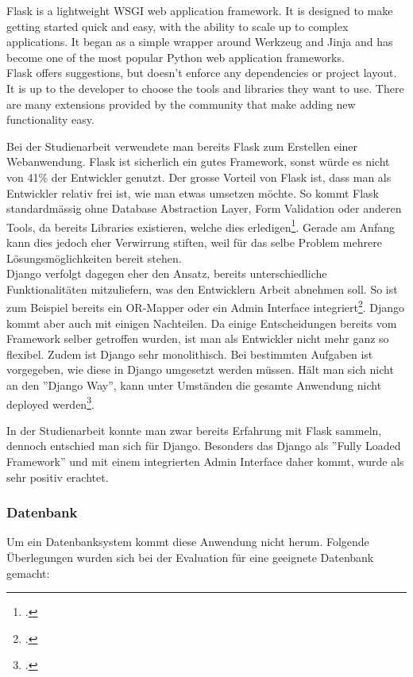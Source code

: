\begin{displayquote}
Flask is a lightweight WSGI web application framework. It is designed to make getting started quick and easy, with the ability to scale up to complex applications. It began as a simple wrapper around Werkzeug and Jinja and has become one of the most popular Python web application frameworks. \\
Flask offers suggestions, but doesn't enforce any dependencies or project layout. It is up to the developer to choose the tools and libraries they want to use. There are many extensions provided by the community that make adding new functionality easy.
\end{displayquote}

Bei der Studienarbeit verwendete man bereits Flask zum Erstellen einer Webanwendung. Flask ist sicherlich ein gutes Framework, sonst würde es nicht von 41\% der Entwickler genutzt. Der grosse Vorteil von Flask ist, dass man als Entwickler relativ frei ist, wie man etwas umsetzen möchte. So kommt Flask standardmässig ohne Database Abstraction Layer, Form Validation oder anderen Tools, da bereits Libraries existieren, welche dies erledigen\footcite{flask:design}. Gerade am Anfang kann dies jedoch eher Verwirrung stiften, weil für das selbe Problem mehrere Lösungsmöglichkeiten bereit stehen. \\

Django verfolgt dagegen eher den Ansatz, bereits unterschiedliche Funktionalitäten mitzuliefern, was den Entwicklern Arbeit abnehmen soll. So ist zum Beispiel bereits ein OR-Mapper oder ein Admin Interface integriert\footcite{django:overview}. 
Django kommt aber auch mit einigen Nachteilen. Da einige Entscheidungen bereits vom Framework selber getroffen wurden, ist man als Entwickler nicht mehr ganz so flexibel. Zudem ist Django sehr monolithisch. Bei bestimmten Aufgaben ist vorgegeben, wie diese in Django umgesetzt werden müssen. Hält man sich nicht an den ''Django Way'', kann unter Umständen die gesamte Anwendung nicht deployed werden\footcite{django:advantages_disadvantages}.

In der Studienarbeit konnte man zwar bereits Erfahrung mit Flask sammeln, dennoch entschied man sich für Django. Besonders das Django als ''Fully Loaded Framework'' und mit einem integrierten Admin Interface daher kommt, wurde als sehr positiv erachtet.


\subsubsection*{Datenbank}
Um ein Datenbanksystem kommt diese Anwendung nicht herum. Folgende Überlegungen wurden sich bei der Evaluation für eine geeignete Datenbank gemacht:

